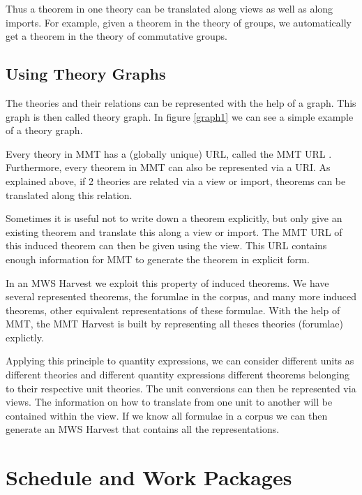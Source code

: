 \documentclass[11pt]{article}
\begin{document}
Thus a theorem in one theory can be translated along views as well as along imports. For example, given a theorem in the theory of groups, we automatically get a theorem in the theory of commutative groups.

\subsection{Using Theory Graphs}
\label{sec:mws:tg}

The theories and their relations can be represented with the help of a graph. This graph is then called theory graph. In figure \ref{graph1} we can see a simple example of a theory graph.



Every theory in MMT has a (globally unique) URL, called the MMT URL . Furthermore, every theorem in MMT can also be represented via a URI. As explained above, if 2 theories are related via a view or import, theorems can be translated along this relation.

Sometimes it is useful not to write down a theorem explicitly, but only give an existing theorem and translate this along a view or import. The MMT URL of this induced theorem can then be given using the view. This URL contains enough information for MMT to generate the theorem in explicit form\cite{IanKohProd:rassmk14}.

In an MWS Harvest we exploit this property of induced theorems. We have several represented theorems, the forumlae in the corpus, and many more induced theorems, other equivalent representations of these formulae. With the help of MMT, the MMT Harvest is built by representing all theses theories (forumlae) explictly.

Applying this principle to quantity expressions, we can consider different units as different theories and different quantity expressions different theorems belonging to their respective unit theories. The unit conversions can then be represented via views. The information on how to translate from one unit to another will be contained within the view. If we know all formulae in a corpus we can then generate an MWS Harvest that contains all the representations. 


\section{Schedule and Work Packages}
\label{sec:timing}
\end{document}
